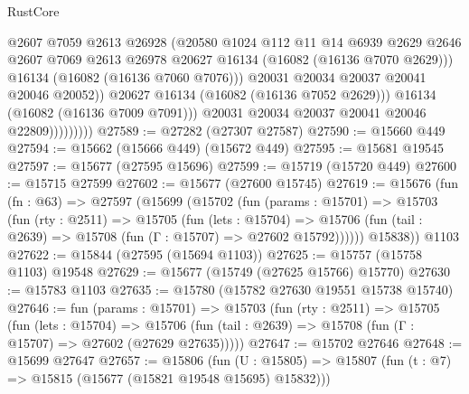 \begin{lexlean}{RustCore}
\begin{coremodule}
                                @2607
                                @7059
                                @2613
                                @26928
                                (@20580
                                  @1024
                                  @112
                                  @11
                                  @14
                                  @6939
                                  @2629
                                  @2646
                                  @2607
                                  @7069
                                  @2613
                                  @26978
                                  @20627
                                  @16134
                                  (@16082 (@16136 @7070 @2629)))
                                @16134
                                (@16082 (@16136 @7060 @7076)))
                              @20031
                              @20034
                              @20037
                              @20041
                              @20046
                              @20052))
                          @20627
                          @16134
                          (@16082 (@16136 @7052 @2629)))
                        @16134
                        (@16082 (@16136 @7009 @7091)))
                      @20031
                      @20034
                      @20037
                      @20041
                      @20046
                      @22809)))))))))
@27589 := @27282 (@27307 @27587)
@27590 := @15660 @449
@27594 := @15662 (@15666 @449) (@15672 @449)
@27595 := @15681 @19545
@27597 := @15677 (@27595 @15696)
@27599 := @15719 (@15720 @449)
@27600 := @15715 @27599
@27602 := @15677 (@27600 @15745)
@27619 := @15676
    (fun (fn : @63) =>
    @27597
      (@15699
        (@15702
          (fun (params : @15701) =>
          @15703
            (fun (rty : @2511) =>
            @15705
              (fun (lets : @15704) =>
              @15706 (fun (tail : @2639) => @15708 (fun (Γ : @15707) => @27602 @15792))))))
        @15838))
    @1103
@27622 := @15844 (@27595 (@15694 @1103))
@27625 := @15757 (@15758 @1103) @19548
@27629 := @15677 (@15749 (@27625 @15766) @15770)
@27630 := @15783 @1103
@27635 := @15780 (@15782 @27630 @19551 @15738 @15740)
@27646 := fun (params : @15701) =>
  @15703
    (fun (rty : @2511) =>
    @15705
      (fun (lets : @15704) =>
      @15706 (fun (tail : @2639) => @15708 (fun (Γ : @15707) => @27602 (@27629 @27635)))))
@27647 := @15702 @27646
@27648 := @15699 @27647
@27657 := @15806
    (fun (U : @15805) => @15807 (fun (t : @7) => @15815 (@15677 (@15821 @19548 @15695) @15832)))

\end{coremodule}
\end{lexlean}
